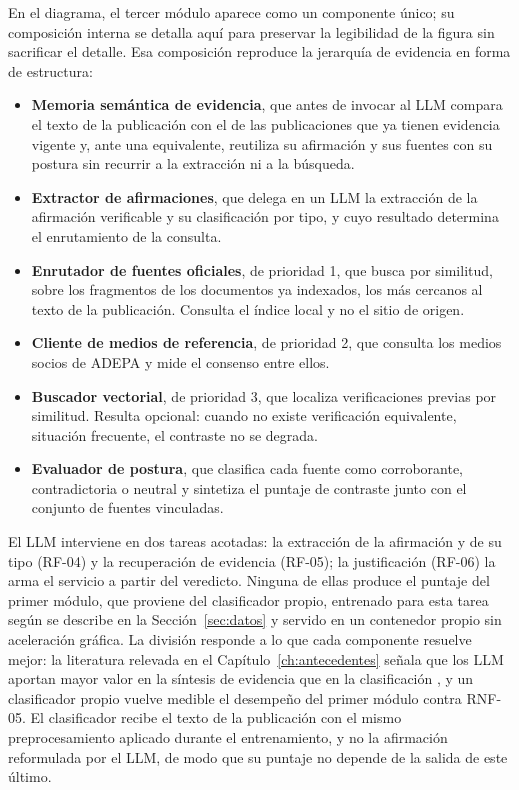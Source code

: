 En el diagrama, el tercer módulo aparece como un componente único; su composición interna se detalla aquí para preservar la legibilidad de la figura sin sacrificar el detalle. Esa composición reproduce la jerarquía de evidencia en forma de estructura:

\begin{itemize}
  \item \textbf{Memoria semántica de evidencia}, que antes de invocar al LLM compara el texto de la publicación con el de las publicaciones que ya tienen evidencia vigente y, ante una equivalente, reutiliza su afirmación y sus fuentes con su postura sin recurrir a la extracción ni a la búsqueda.
  \item \textbf{Extractor de afirmaciones}, que delega en un LLM la extracción de la afirmación verificable y su clasificación por tipo, y cuyo resultado determina el enrutamiento de la consulta.
  \item \textbf{Enrutador de fuentes oficiales}, de prioridad 1, que busca por similitud, sobre los fragmentos de los documentos ya indexados, los más cercanos al texto de la publicación. Consulta el índice local y no el sitio de origen.
  \item \textbf{Cliente de medios de referencia}, de prioridad 2, que consulta los medios socios de ADEPA y mide el consenso entre ellos.
  \item \textbf{Buscador vectorial}, de prioridad 3, que localiza verificaciones previas por similitud. Resulta opcional: cuando no existe verificación equivalente, situación frecuente, el contraste no se degrada.
  \item \textbf{Evaluador de postura}, que clasifica cada fuente como corroborante, contradictoria o neutral y sintetiza el puntaje de contraste junto con el conjunto de fuentes vinculadas.
\end{itemize}

El LLM interviene en dos tareas acotadas: la extracción de la afirmación y de su tipo (RF-04) y la recuperación de evidencia (RF-05); la justificación (RF-06) la arma el servicio a partir del veredicto. Ninguna de ellas produce el puntaje del primer módulo, que proviene del clasificador propio, entrenado para esta tarea según se describe en la Sección~\ref{sec:datos} y servido en un contenedor propio sin aceleración gráfica. La división responde a lo que cada componente resuelve mejor: la literatura relevada en el Capítulo~\ref{ch:antecedentes} señala que los LLM aportan mayor valor en la síntesis de evidencia que en la clasificación \parencite{SrbaEtAl2025}, y un clasificador propio vuelve medible el desempeño del primer módulo contra RNF-05. El clasificador recibe el texto de la publicación con el mismo preprocesamiento aplicado durante el entrenamiento, y no la afirmación reformulada por el LLM, de modo que su puntaje no depende de la salida de este último.

